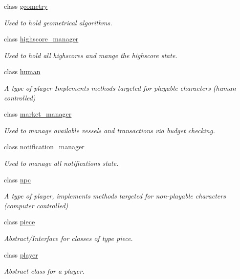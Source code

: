 \begin{DoxyCompactItemize}
class \hyperlink{classbattle__ship_1_1geometry}{geometry}
\begin{DoxyCompactList}\small\item\em Used to hold geometrical algorithms. \end{DoxyCompactList}\item 
class \hyperlink{classbattle__ship_1_1highscore__manager}{highscore\+\_\+manager}
\begin{DoxyCompactList}\small\item\em Used to hold all highscores and mange the highscore state. \end{DoxyCompactList}\item 
class \hyperlink{classbattle__ship_1_1human}{human}
\begin{DoxyCompactList}\small\item\em A type of player Implements methods targeted for playable characters (human controlled) \end{DoxyCompactList}\item 
class \hyperlink{classbattle__ship_1_1market__manager}{market\+\_\+manager}
\begin{DoxyCompactList}\small\item\em Used to manage available vessels and transactions via budget checking. \end{DoxyCompactList}\item 
class \hyperlink{classbattle__ship_1_1notification__manager}{notification\+\_\+manager}
\begin{DoxyCompactList}\small\item\em Used to manage all notifications state. \end{DoxyCompactList}\item 
class \hyperlink{classbattle__ship_1_1npc}{npc}
\begin{DoxyCompactList}\small\item\em A type of player, implements methods targeted for non-\/playable characters (computer controlled) \end{DoxyCompactList}\item 
class \hyperlink{classbattle__ship_1_1piece}{piece}
\begin{DoxyCompactList}\small\item\em Abstract/\+Interface for classes of type piece. \end{DoxyCompactList}\item 
class \hyperlink{classbattle__ship_1_1player}{player}
\begin{DoxyCompactList}\small\item\em Abstract class for a player. \end{DoxyCompactList}\item 

\end{DoxyCompactItemize}
